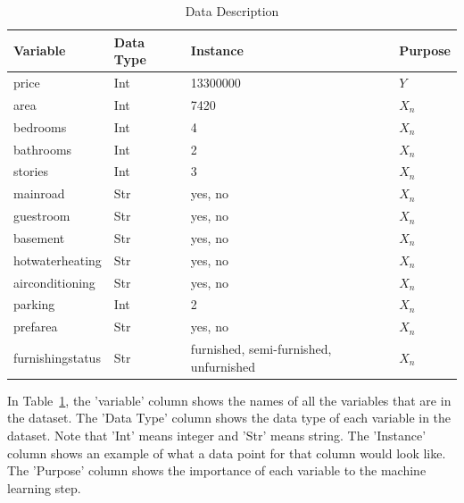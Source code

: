 \documentclass[12pt]{article}
\begin{document}
\begin{table}
\caption{Data Description}
  \label{tab:rv}
\begin{tabular}{llll}
  \toprule
Variable & Data Type & Instance & Purpose \\
  \midrule
price & Int & 13300000 & \(Y\) \\ 
area & Int & 7420 & \(X_{n}\) \\ 
bedrooms & Int & 4 & \(X_{n}\) \\ 
bathrooms & Int & 2 & \(X_{n}\) \\ 
stories & Int & 3 & \(X_{n}\) \\ 
mainroad & Str & yes, no & \(X_{n}\) \\
guestroom & Str & yes, no & \(X_{n}\) \\
basement & Str & yes, no & \(X_{n}\) \\
hotwaterheating & Str & yes, no & \(X_{n}\) \\
airconditioning & Str & yes, no & \(X_{n}\) \\
parking & Int & 2 & \(X_{n}\) \\
prefarea & Str & yes, no & \(X_{n}\) \\
furnishingstatus & Str & furnished, semi-furnished, unfurnished & \(X_{n}\) \\
   \bottomrule
\end{tabular}\par
\bigskip
In Table~\ref{tab:rv}, the 'variable' column shows the names of all the variables that are in the dataset. The 'Data Type' column shows the data type of each variable in the dataset. Note that 'Int' means integer and 'Str' means string. The 'Instance' column shows an example of what a data point for that column would look like. The 'Purpose' column shows the importance of each variable to the machine learning step.
\end{table}
\end{document}
